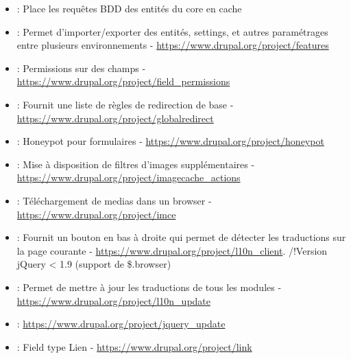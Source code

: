 \documentclass[a4paper,11pt,french]{rtdsphinxmanual}
\begin{document}
\begin{itemize}
\item {} 
 : Place les requêtes BDD des entités du core en cache

\item {} 
 : Permet d'importer/exporter des entités, settings, et autres paramétrages entre plusieurs environnements - \href{https://www.drupal.org/project/features}{https://www.drupal.org/project/features}

\item {} 
 : Permissions sur des champs - \href{https://www.drupal.org/project/field\_permissions}{https://www.drupal.org/project/field\_permissions}

\item {} 
 : Fournit une liste de règles de redirection de base - \href{https://www.drupal.org/project/globalredirect}{https://www.drupal.org/project/globalredirect}

\item {} 
 : Honeypot pour formulaires - \href{https://www.drupal.org/project/honeypot}{https://www.drupal.org/project/honeypot}

\item {} 
 : Mise à disposition de filtres d'images supplémentaires - \href{https://www.drupal.org/project/imagecache\_actions}{https://www.drupal.org/project/imagecache\_actions}

\item {} 
 : Téléchargement de medias dans un browser - \href{https://www.drupal.org/project/imce}{https://www.drupal.org/project/imce}

\item {} 
 : Fournit un bouton en bas à droite qui permet de détecter les traductions sur la page courante - \href{https://www.drupal.org/project/l10n\_client}{https://www.drupal.org/project/l10n\_client}. /!Version jQuery \textless{} 1.9 (support de \$.browser)

\item {} 
 : Permet de mettre à jour les traductions de tous les modules - \href{https://www.drupal.org/project/l10n\_update}{https://www.drupal.org/project/l10n\_update}

\item {} 
 : \href{https://www.drupal.org/project/jquery\_update}{https://www.drupal.org/project/jquery\_update}

\item {} 
 : Field type Lien - \href{https://www.drupal.org/project/link}{https://www.drupal.org/project/link}


\end{itemize}
\end{document}
